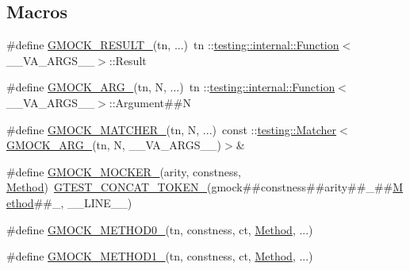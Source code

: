 \subsection*{Macros}
\begin{DoxyCompactItemize}
\item 
\#define \mbox{\hyperlink{gmock-generated-function-mockers_8h_a0e9d94e9c77df84f1103af06feee1077}{G\+M\+O\+C\+K\+\_\+\+R\+E\+S\+U\+L\+T\+\_\+}}(tn, ...)~tn \+::\mbox{\hyperlink{structtesting_1_1internal_1_1Function}{testing\+::internal\+::\+Function}}$<$\+\_\+\+\_\+\+V\+A\+\_\+\+A\+R\+G\+S\+\_\+\+\_\+$>$\+::Result
\item 
\#define \mbox{\hyperlink{gmock-generated-function-mockers_8h_a887575cc1c31158fba808180a10c004f}{G\+M\+O\+C\+K\+\_\+\+A\+R\+G\+\_\+}}(tn,  N, ...)~tn \+::\mbox{\hyperlink{structtesting_1_1internal_1_1Function}{testing\+::internal\+::\+Function}}$<$\+\_\+\+\_\+\+V\+A\+\_\+\+A\+R\+G\+S\+\_\+\+\_\+$>$\+::Argument\#\#N
\item 
\#define \mbox{\hyperlink{gmock-generated-function-mockers_8h_aa87d0009fe91f1c89d658776b55a769c}{G\+M\+O\+C\+K\+\_\+\+M\+A\+T\+C\+H\+E\+R\+\_\+}}(tn,  N, ...)~const \+::\mbox{\hyperlink{classtesting_1_1Matcher}{testing\+::\+Matcher}}$<$\mbox{\hyperlink{gmock-generated-function-mockers_8h_a887575cc1c31158fba808180a10c004f}{G\+M\+O\+C\+K\+\_\+\+A\+R\+G\+\_\+}}(tn, N, \+\_\+\+\_\+\+V\+A\+\_\+\+A\+R\+G\+S\+\_\+\+\_\+)$>$\&
\item 
\#define \mbox{\hyperlink{gmock-generated-function-mockers_8h_a7d362499e27b1bc3a9806dd3cf58a5b7}{G\+M\+O\+C\+K\+\_\+\+M\+O\+C\+K\+E\+R\+\_\+}}(arity,  constness,  \mbox{\hyperlink{gmock-spec-builders__test_8cc_a95606368148f3e5aab5db46c32466afd}{Method}})~\mbox{\hyperlink{gtest-internal_8h_ae3c336cbe1ae2bd1b1d019333e4428a0}{G\+T\+E\+S\+T\+\_\+\+C\+O\+N\+C\+A\+T\+\_\+\+T\+O\+K\+E\+N\+\_\+}}(gmock\#\#constness\#\#arity\#\#\+\_\+\#\#\mbox{\hyperlink{gmock-spec-builders__test_8cc_a95606368148f3e5aab5db46c32466afd}{Method}}\#\#\+\_\+, \+\_\+\+\_\+\+L\+I\+N\+E\+\_\+\+\_\+)
\item 
\#define \mbox{\hyperlink{gmock-generated-function-mockers_8h_ae0d290ffa58d7c624b2e3487ba1252f4}{G\+M\+O\+C\+K\+\_\+\+M\+E\+T\+H\+O\+D0\+\_\+}}(tn,  constness,  ct,  \mbox{\hyperlink{gmock-spec-builders__test_8cc_a95606368148f3e5aab5db46c32466afd}{Method}}, ...)
\item 
\#define \mbox{\hyperlink{gmock-generated-function-mockers_8h_a1bc0012d62440dda77208dabdf4925c9}{G\+M\+O\+C\+K\+\_\+\+M\+E\+T\+H\+O\+D1\+\_\+}}(tn,  constness,  ct,  \mbox{\hyperlink{gmock-spec-builders__test_8cc_a95606368148f3e5aab5db46c32466afd}{Method}}, ...)

\end{DoxyCompactItemize}
